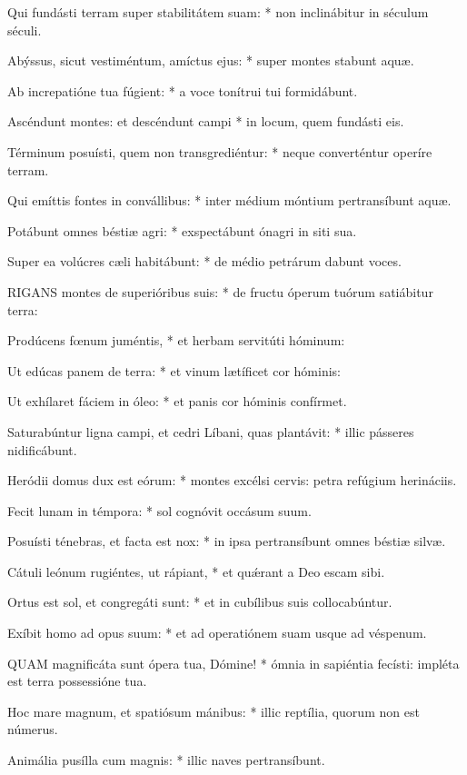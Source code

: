 Qui fundásti terram super stabilitátem suam: * non inclinábitur in séculum séculi.

Abýssus, sicut vestiméntum, amíctus ejus: * super montes stabunt aquæ.

Ab increpatióne tua fúgient: * a voce tonítrui tui formidábunt.

Ascéndunt montes: et descéndunt campi * in locum, quem fundásti eis.

Términum posuísti, quem non transgrediéntur: * neque converténtur operíre terram.

Qui emíttis fontes in convállibus: * inter médium móntium pertransíbunt aquæ.

Potábunt omnes béstiæ agri: * exspectábunt ónagri in siti sua.

Super ea volúcres cæli habitábunt: * de médio petrárum dabunt voces.


\lettrine[lines=2]{R}{IGANS} montes de superióribus suis: * de fructu óperum tuórum satiábitur terra:

Prodúcens fœnum juméntis, * et herbam servitúti hóminum:

Ut edúcas panem de terra: * et vinum lætíficet cor hóminis:

Ut exhílaret fáciem in óleo: * et panis cor hóminis confírmet.

Saturabúntur ligna campi, et cedri Líbani, quas plantávit: * illic pásseres nidificábunt.

Heródii domus dux est eórum: * montes excélsi cervis: petra refúgium herináciis.

Fecit lunam in témpora: * sol cognóvit occásum suum.

Posuísti ténebras, et facta est nox: * in ipsa pertransíbunt omnes béstiæ silvæ.

Cátuli leónum rugiéntes, ut rápiant, * et quǽrant a Deo escam sibi.

Ortus est sol, et congregáti sunt: * et in cubílibus suis collocabúntur.

Exíbit homo ad opus suum: * et ad operatiónem suam usque ad véspenum.


\lettrine[lines=2]{Q}{UAM} magnificáta sunt ópera tua, Dómine! * ómnia in sapiéntia fecísti: impléta est terra possessióne tua.

Hoc mare magnum, et spatiósum mánibus: * illic reptília, quorum non est númerus.

Animália pusílla cum magnis: * illic naves pertransíbunt.

